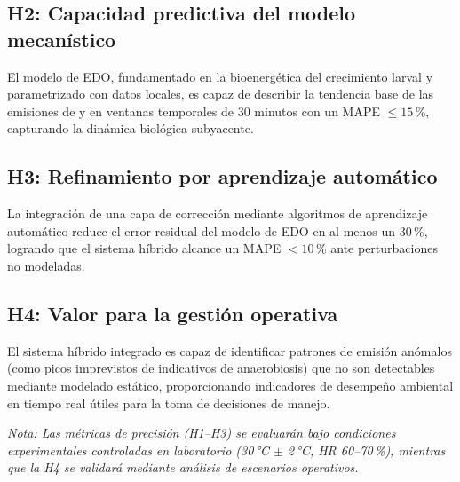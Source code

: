 \subsection{H2: Capacidad predictiva del modelo mecanístico}
El modelo de EDO, fundamentado en la bioenergética del crecimiento larval y parametrizado con datos locales, es capaz de describir la tendencia base de las emisiones de  y  en ventanas temporales de 30 minutos con un MAPE $\leq 15$\,\%, capturando la dinámica biológica subyacente.

\subsection{H3: Refinamiento por aprendizaje automático}
La integración de una capa de corrección mediante algoritmos de aprendizaje automático reduce el error residual del modelo de EDO en al menos un 30\,\%, logrando que el sistema híbrido alcance un MAPE $< 10$\,\% ante perturbaciones no modeladas.
\subsection{H4: Valor para la gestión operativa}
El sistema híbrido integrado es capaz de identificar patrones de emisión anómalos (como picos imprevistos de  indicativos de anaerobiosis) que no son detectables mediante modelado estático, proporcionando indicadores de desempeño ambiental en tiempo real útiles para la toma de decisiones de manejo.

\emph{Nota: Las métricas de precisión (H1--H3) se evaluarán bajo condiciones experimentales controladas en laboratorio (30\,°C $\pm$ 2\,°C, HR 60--70\,\%), mientras que la H4 se validará mediante análisis de escenarios operativos.}